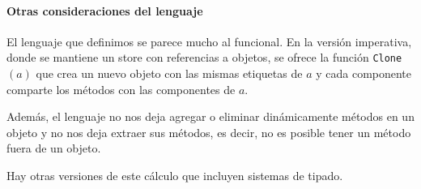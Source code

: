 \paragraph{Otras consideraciones del lenguaje}
El lenguaje que definimos se parece mucho al funcional. En la versión imperativa, donde se mantiene un store con referencias a objetos, se ofrece la función \texttt{Clone}$(a)$ que crea un nuevo objeto con las mismas etiquetas de $a$ y cada componente comparte los métodos con las componentes de $a$.

Además, el lenguaje no nos deja agregar o eliminar dinámicamente métodos en un objeto y no nos deja extraer sus métodos, es decir, no es posible tener un método fuera de un objeto.

Hay otras versiones de este cálculo que incluyen sistemas de tipado.